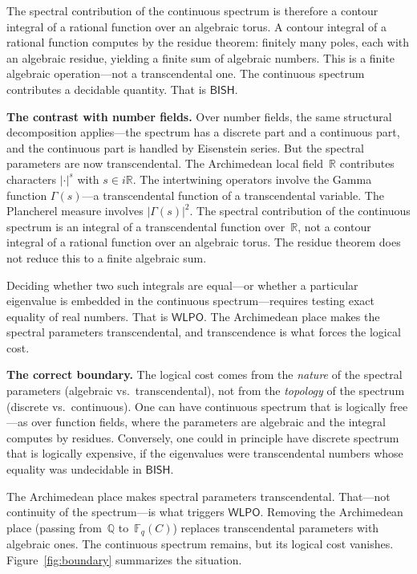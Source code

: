 \documentclass[11pt]{article}
\theoremstyle{plain}
\theoremstyle{definition}
\theoremstyle{remark}
\newcommand{\Q}{\mathbb{Q}}
\newcommand{\R}{\mathbb{R}}
\newcommand{\Fq}{\mathbb{F}_q}
\newcommand{\BISH}{\mathsf{BISH}}
\newcommand{\WLPO}{\mathsf{WLPO}}
\begin{document}
The spectral contribution of the continuous spectrum is therefore a contour
integral of a rational function over an algebraic torus. A contour integral of
a rational function computes by the residue theorem: finitely many poles,
each with an algebraic residue, yielding a finite sum of algebraic numbers.
This is a finite algebraic operation---not a transcendental one. The continuous
spectrum contributes a decidable quantity. That is $\BISH$.

\medskip\noindent
\textbf{The contrast with number fields.}
Over number fields, the same structural decomposition applies---the spectrum
has a discrete part and a continuous part, and the continuous part is handled
by Eisenstein series. But the spectral parameters are now transcendental. The
Archimedean local field~$\R$ contributes characters $|\cdot|^s$ with
$s \in i\R$. The intertwining operators involve the Gamma function
$\Gamma(s)$---a transcendental function of a transcendental variable.
The Plancherel measure involves $|\Gamma(s)|^2$. The spectral contribution
of the continuous spectrum is an integral of a transcendental function
over~$\R$, not a contour integral of a rational function over an algebraic
torus. The residue theorem does not reduce this to a finite algebraic sum.

Deciding whether two such integrals are equal---or whether a particular
eigenvalue is embedded in the continuous spectrum---requires testing exact
equality of real numbers. That is $\WLPO$. The Archimedean place makes the
spectral parameters transcendental, and transcendence is what forces the
logical cost.

\medskip\noindent
\textbf{The correct boundary.}
The logical cost comes from the \emph{nature} of the spectral parameters
(algebraic vs.\ transcendental), not from the \emph{topology} of the spectrum
(discrete vs.\ continuous). One can have continuous spectrum that is logically
free---as over function fields, where the parameters are algebraic and
the integral computes by residues. Conversely, one could in principle have
discrete spectrum that is logically expensive, if the eigenvalues were
transcendental numbers whose equality was undecidable in $\BISH$.

The Archimedean place makes spectral parameters transcendental. That---not
continuity of the spectrum---is what triggers $\WLPO$. Removing the
Archimedean place (passing from~$\Q$ to~$\Fq(C)$) replaces transcendental
parameters with algebraic ones. The continuous spectrum remains, but its
logical cost vanishes. Figure~\ref{fig:boundary} summarizes the situation.
\end{document}
